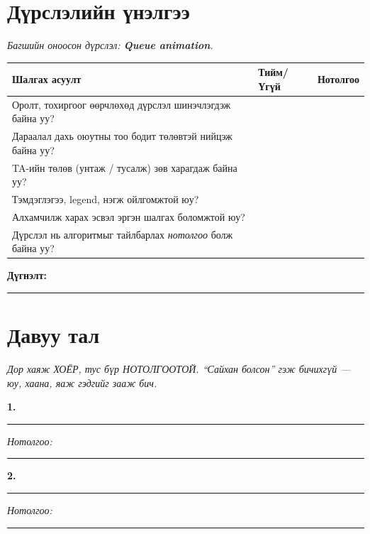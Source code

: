 \documentclass[11pt,a4paper]{article}
\begin{document}
\section{Дүрслэлийн үнэлгээ}
\emph{Багшийн оноосон дүрслэл: \textbf{Queue animation}.}

\begin{center}
\small
\begin{tabular}{L{9.4cm}L{2.0cm}L{3.0cm}}
\toprule
Шалгах асуулт & Тийм/Үгүй & Нотолгоо \\
\midrule
Оролт, тохиргоог өөрчлөхөд дүрслэл шинэчлэгдэж байна уу? & & \\[5pt]
Дараалал дахь оюутны тоо бодит төлөвтэй нийцэж байна уу? & & \\[5pt]
TA-ийн төлөв (унтаж / тусалж) зөв харагдаж байна уу? & & \\[5pt]
Тэмдэглэгээ, legend, нэгж ойлгомжтой юу? & & \\[5pt]
Алхамчилж харах эсвэл эргэн шалгах боломжтой юу? & & \\[5pt]
Дүрслэл нь алгоритмыг тайлбарлах \emph{нотолгоо} болж байна уу? & & \\
\bottomrule
\end{tabular}
\end{center}

\textbf{Дүгнэлт:}\\[3mm]
\noindent\rule{\textwidth}{0.4pt}

\section{Давуу тал}
\emph{Дор хаяж ХОЁР, тус бүр НОТОЛГООТОЙ. ``Сайхан болсон'' гэж бичихгүй ---
юу, хаана, яаж гэдгийг зааж бич.}

\textbf{1.}\\[3mm]
\noindent\rule{\textwidth}{0.4pt}

\vspace{1mm}\emph{Нотолгоо:}\\[3mm]
\noindent\rule{\textwidth}{0.4pt}

\vspace{3mm}
\textbf{2.}\\[3mm]
\noindent\rule{\textwidth}{0.4pt}

\vspace{1mm}\emph{Нотолгоо:}\\[3mm]
\noindent\rule{\textwidth}{0.4pt}
\end{document}
